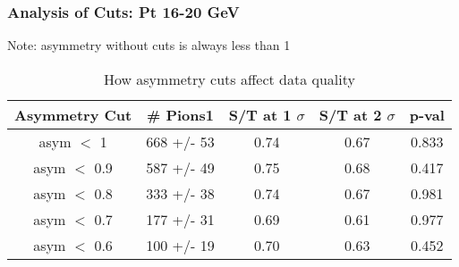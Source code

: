 \frame
{
\frametitle{Analysis of Cuts: Pt 16-20 GeV}
Note: asymmetry without cuts is always less than 1
\begin{table}
\caption{How asymmetry cuts affect data quality}
\centering
\begin{tabular}{c c c c c}
\hline\hline
Asymmetry Cut & \# Pions1 & S/T at 1 $\sigma$ & S/T at 2 $\sigma$ & p-val \\ [0.5ex]
\hline
asym $<$ 1 &  668 +/-   53 & 0.74 & 0.67 & 0.833 \\ %
asym $<$ 0.9 &  587 +/-   49 & 0.75 & 0.68 & 0.417 \\ %
asym $<$ 0.8 &  333 +/-   38 & 0.74 & 0.67 & 0.981 \\ %
asym $<$ 0.7 &  177 +/-   31 & 0.69 & 0.61 & 0.977 \\ %
asym $<$ 0.6 &  100 +/-   19 & 0.70 & 0.63 & 0.452 \\ %
[1ex]
\hline
\end{tabular}
\label{table:nonlin}
\end{table}
}
